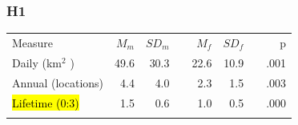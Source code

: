 \documentclass{beamer}
\makeatletter
\newcommand\SoulColor{%
  \let\set@color\beamerorig@set@color
  \let\reset@color\beamerorig@reset@color}
\makeatother
\begin{document}

\begin{frame}
\frametitle{H1}
\begin{table}
\begin{tabular}{lrrrrrrr}
\hline\noalign{\smallskip}
Measure & $M_{m}$ & $SD_{m}$ && $M_{f}$ & $SD_{f}$ && p \\
\noalign{\smallskip}\hline\noalign{\smallskip}
Daily (km$^{2}$ ) & 49.6 & 30.3 && 22.6 & 10.9 && .001 \\
Annual (locations) & 4.4 & 4.0 && 2.3 & 1.5 && .003 \\
\SoulColor\hl{Lifetime (0:3)} & 1.5 & 0.6 && 1.0 & 0.5 && .000 \\
\noalign{\smallskip}\hline
\end{tabular}\par
\end{table}		  

\end{frame}


\end{document}
